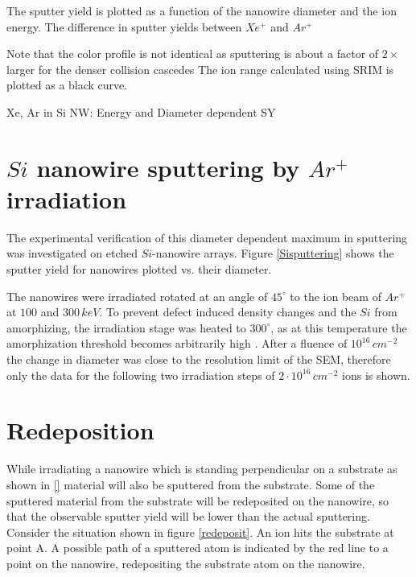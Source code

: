 The sputter yield is plotted as a function of the nanowire diameter and the ion energy. The difference in sputter yields between $Xe^+$ and $Ar^+$ 

Note that the color profile is not identical as sputtering is about a factor of $2\times$ larger for the denser collision cascedes 
 The ion range calculated using SRIM is plotted as a black curve.



 
Xe, Ar in Si NW: Energy and Diameter dependent SY

\section{$Si$ nanowire sputtering by $Ar^+$ irradiation}
\label{sec:sisputtering}

The experimental verification of this diameter dependent maximum in sputtering was investigated on etched $Si$-nanowire arrays. Figure \ref{Sisputtering} shows the sputter yield for nanowires plotted vs. their diameter. 

The nanowires were irradiated rotated at an angle of $45^\circ$ to the ion beam of $Ar^+$ at $100$ and $300\,keV$. To prevent defect induced density changes and the $Si$ from amorphizing, the irradiation stage was heated to $300^\circ$, as at this temperature the amorphization threshold becomes arbitrarily high \cite{pelaz_ion-beam-induced_2004}. After a fluence of $10^{16}\,cm^{-2}$ the change in diameter was close to the resolution limit of the SEM, therefore only the data for the following two irradiation steps of $2\cdot 10^{16}\,cm^{-2}$ ions is shown.


\section{Redeposition}
\label{sec:redeposition}

While irradiating a nanowire which is standing perpendicular on a substrate as shown in \ref{} material will also be sputtered from the substrate. Some of the sputtered material from the substrate will be redeposited on the nanowire, so that the observable sputter yield will be lower than the actual sputtering. Consider the situation shown in figure \ref{redeposit}. An ion hits the substrate at point A. A possible path of a sputtered atom is indicated by the red line to a point on the nanowire, redepositing the substrate atom on the nanowire. 


